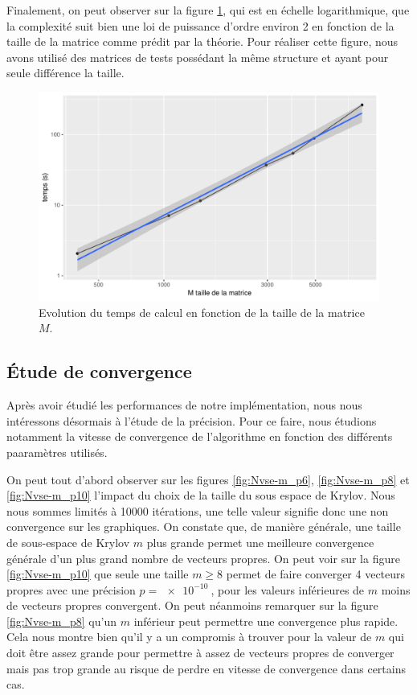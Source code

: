 \documentclass[11pt,a4paper]{article}
\begin{document}
		Finalement, on peut observer sur la figure \ref{fig:tvsM}, qui est en échelle logarithmique, que la complexité suit bien une loi de puissance d'ordre environ 2 en fonction de la taille de la matrice comme prédit par la théorie. Pour réaliser cette figure, nous avons utilisé des matrices de tests possédant la même structure et ayant pour seule différence la taille.
		\begin{figure}
			\centering
			\includegraphics[width = 0.7\linewidth]{plots/tvsM.pdf}
			\caption{Evolution du temps de calcul en fonction de la taille de la matrice $M$. \label{fig:tvsM}}
		\end{figure}


	\subsection{\'Etude de convergence}
		Après avoir étudié les performances de notre implémentation, nous nous intéressons désormais à l'étude de la précision. Pour ce faire, nous étudions notamment la vitesse de convergence de l'algorithme en fonction des différents paaramètres utilisés.

		On peut tout d'abord observer sur les figures \ref{fig:Nvse-m_p6}, \ref{fig:Nvse-m_p8} et \ref{fig:Nvse-m_p10} l'impact du choix de la taille du sous espace de Krylov. Nous nous sommes limités à 10000 itérations, une telle valeur signifie donc une non convergence sur les graphiques. On constate que, de manière générale, une taille de sous-espace de Krylov $m$ plus grande permet une meilleure convergence générale d'un plus grand nombre de vecteurs propres. On peut voir sur la figure \ref{fig:Nvse-m_p10} que seule une taille $m \geq 8$ permet de faire converger 4 vecteurs propres avec une précision $p=\SI{e-10}{}$, pour les valeurs inférieures de $m$ moins de vecteurs propres convergent. On peut néanmoins remarquer sur la figure \ref{fig:Nvse-m_p8} qu'un $m$ inférieur peut permettre une convergence plus rapide. Cela nous montre bien qu'il y a un compromis à trouver pour la valeur de $m$ qui doit être assez grande pour permettre à assez de vecteurs propres de converger mais pas trop grande au risque de perdre en vitesse de convergence dans certains cas.
\end{document}
